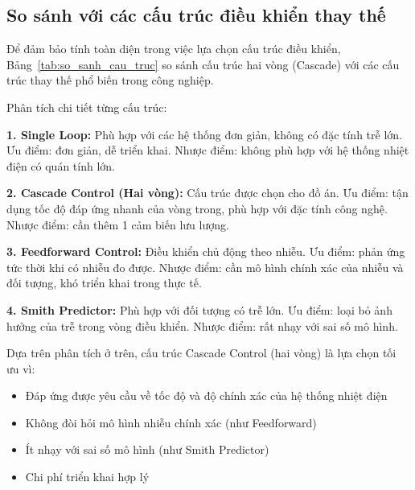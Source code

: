 \documentclass[../main.tex]{subfiles}
\begin{document}
\subsection{So sánh với các cấu trúc điều khiển thay thế}

Để đảm bảo tính toàn diện trong việc lựa chọn cấu trúc điều khiển, Bảng~\ref{tab:so_sanh_cau_truc} so sánh cấu trúc hai vòng (Cascade) với các cấu trúc thay thế phổ biến trong công nghiệp.

\begin{table}[htbp]
\centering
\caption{So sánh các cấu trúc điều khiển}
\label{tab:so_sanh_cau_truc}
\end{table}

Phân tích chi tiết từng cấu trúc:

\textbf{1. Single Loop:} Phù hợp với các hệ thống đơn giản, không có đặc tính trễ lớn. Ưu điểm: đơn giản, dễ triển khai. Nhược điểm: không phù hợp với hệ thống nhiệt điện có quán tính lớn.

\textbf{2. Cascade Control (Hai vòng):} Cấu trúc được chọn cho đồ án. Ưu điểm: tận dụng tốc độ đáp ứng nhanh của vòng trong, phù hợp với đặc tính công nghệ. Nhược điểm: cần thêm 1 cảm biến lưu lượng.

\textbf{3. Feedforward Control:} Điều khiển chủ động theo nhiễu. Ưu điểm: phản ứng tức thời khi có nhiễu đo được. Nhược điểm: cần mô hình chính xác của nhiễu và đối tượng, khó triển khai trong thực tế.

\textbf{4. Smith Predictor:} Phù hợp với đối tượng có trễ lớn. Ưu điểm: loại bỏ ảnh hưởng của trễ trong vòng điều khiển. Nhược điểm: rất nhạy với sai số mô hình.

\begin{tcolorbox}[colback=green!5!white, colframe=green!75!black, title={Kết luận lựa chọn}]
Dựa trên phân tích ở trên, cấu trúc Cascade Control (hai vòng) là lựa chọn tối ưu vì:
\begin{itemize}
    \item Đáp ứng được yêu cầu về tốc độ và độ chính xác của hệ thống nhiệt điện
    \item Không đòi hỏi mô hình nhiễu chính xác (như Feedforward)
    \item Ít nhạy với sai số mô hình (như Smith Predictor)
    \item Chi phí triển khai hợp lý
\end{itemize}
\end{tcolorbox}
\end{document}
